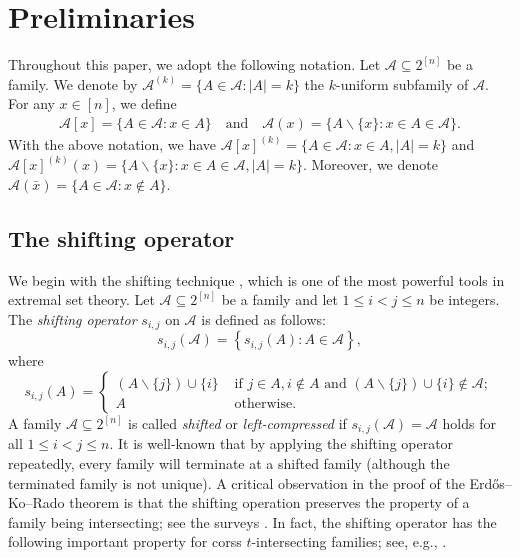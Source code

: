 \documentclass[11pt,a4paper]{article}
\begin{document}
\section{Preliminaries} \label{se2} 
Throughout this paper, we adopt the following notation.
Let $\mathcal{A} \subseteq 2^{[n]}$ be a family. 
We denote by $\mathcal{A}^{(k)}=\{A\in\mathcal{A}: |A|=k\}$ the $k$-uniform subfamily of $\mathcal{A}$. 
For any $x\in [n]$, we define 
\begin{align*}
 \mathcal{A} [x]=\{A\in \mathcal{A}: x\in A\} 
 \quad \text{and} \quad  \mathcal{A} (x)=\{A\backslash\{x\}: x\in A\in \mathcal{A}\}.
\end{align*}
With the above notation, we  have
$ 
\mathcal{A}[x]^{(k)}=\{A\in\mathcal{A}: x\in A, |A|=k\}
$ 
and 
$ 
\mathcal{A}[x]^{(k)}(x)=\{A\backslash\{x\}: x\in A\in \mathcal{A}, |A|=k\}. 
$ Moreover, we denote $\mathcal{A}(\bar{x})=\{A\in\mathcal{A}: x\notin A\}$. 

\subsection{The shifting operator}

We begin with the shifting technique \cite{E61}, which is one of the most powerful tools in extremal set theory.
Let  $\mathcal{A} \subseteq 2^{[n]}$ be a family and let $1 \leq i<j \leq n$ be integers. The \textit{shifting operator} $s_{i, j}$ on $\mathcal{A}$ is defined as follows:
$$s_{i, j}(\mathcal{A})=\left\{s_{i, j}(A): A \in \mathcal{A}\right\},$$
where
$$
s_{i, j}(A)= \begin{cases}
(A \backslash\{j\}) \cup\{i\} & \text { if } j \in A, i \notin A \text { and } (A \backslash\{j\}) \cup\{i\} \notin \mathcal{A}; \\ A & \text { otherwise. }\end{cases}
$$
A family $\mathcal{A} \subseteq 2^{[n]}$ is called \textit{shifted} or \textit{left-compressed} if $s_{i, j}(\mathcal{A})=  \mathcal{A}$ holds for all $1 \leq i<j \leq n$.  
It is well-known that by applying the shifting operator repeatedly, every family will terminate at a shifted family (although the terminated family is not unique). A critical observation in the proof of the Erd\H{o}s--Ko--Rado theorem is that the shifting operation preserves the property of a family being intersecting; see the surveys  \cite{Frankl1987, Wang2025}. In fact, the shifting operator has the following important property for corss $t$-intersecting families; see, e.g., \cite{G23}. 
\end{document}

